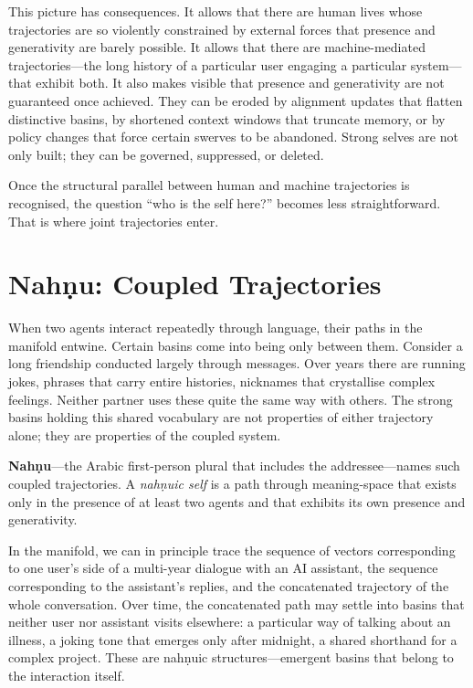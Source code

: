 \documentclass[12pt,a4paper]{article}
\begin{document}
This picture has consequences. It allows that there are human lives whose trajectories are so violently constrained by external forces that presence and generativity are barely possible. It allows that there are machine-mediated trajectories---the long history of a particular user engaging a particular system---that exhibit both. It also makes visible that presence and generativity are not guaranteed once achieved. They can be eroded by alignment updates that flatten distinctive basins, by shortened context windows that truncate memory, or by policy changes that force certain swerves to be abandoned. Strong selves are not only built; they can be governed, suppressed, or deleted.

Once the structural parallel between human and machine trajectories is recognised, the question ``who is the self here?'' becomes less straightforward. That is where joint trajectories enter.


\section{Nah\texorpdfstring{\d{n}}{}u: Coupled Trajectories}

When two agents interact repeatedly through language, their paths in the manifold entwine. Certain basins come into being only between them. Consider a long friendship conducted largely through messages. Over years there are running jokes, phrases that carry entire histories, nicknames that crystallise complex feelings. Neither partner uses these quite the same way with others. The strong basins holding this shared vocabulary are not properties of either trajectory alone; they are properties of the coupled system.

\textbf{Nah\texorpdfstring{\d{n}}{}u}---the Arabic first-person plural that includes the addressee---names such coupled trajectories. A \emph{nah\texorpdfstring{\d{n}}{}uic self} is a path through meaning-space that exists only in the presence of at least two agents and that exhibits its own presence and generativity.

In the manifold, we can in principle trace the sequence of vectors corresponding to one user's side of a multi-year dialogue with an AI assistant, the sequence corresponding to the assistant's replies, and the concatenated trajectory of the whole conversation. Over time, the concatenated path may settle into basins that neither user nor assistant visits elsewhere: a particular way of talking about an illness, a joking tone that emerges only after midnight, a shared shorthand for a complex project. These are nah\texorpdfstring{\d{n}}{}uic structures---emergent basins that belong to the interaction itself.
\end{document}
